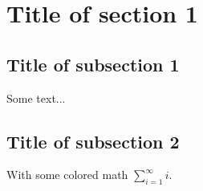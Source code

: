 \section{Title of section 1}
\subsection*{Title of subsection 1}
Some text...
\subsection*{Title of subsection 2}
With some colored math $\sum_{i=1}^\infty i$.